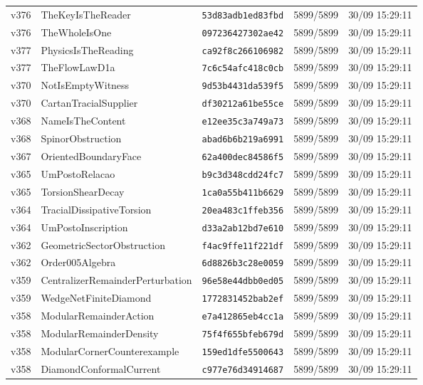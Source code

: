 \documentclass[11pt]{article}
\theoremstyle{definition}\newtheorem{deriv}{Derivação}
\begin{document}
{\begin{longtable}{@{}lllll@{}}
v376 & TheKeyIsTheReader & \texttt{53d83adb1ed83fbd} & 5899/5899 & 30/09 15:29:11 \\
v376 & TheWholeIsOne & \texttt{097236427302ae42} & 5899/5899 & 30/09 15:29:11 \\
v377 & PhysicsIsTheReading & \texttt{ca92f8c266106982} & 5899/5899 & 30/09 15:29:11 \\
v377 & TheFlowLawD1a & \texttt{7c6c54afc418c0cb} & 5899/5899 & 30/09 15:29:11 \\
v370 & NotIsEmptyWitness & \texttt{9d53b4431da539f5} & 5899/5899 & 30/09 15:29:11 \\
v370 & CartanTracialSupplier & \texttt{df30212a61be55ce} & 5899/5899 & 30/09 15:29:11 \\
v368 & NameIsTheContent & \texttt{e12ee35c3a749a73} & 5899/5899 & 30/09 15:29:11 \\
v368 & SpinorObstruction & \texttt{abad6b6b219a6991} & 5899/5899 & 30/09 15:29:11 \\
v367 & OrientedBoundaryFace & \texttt{62a400dec84586f5} & 5899/5899 & 30/09 15:29:11 \\
v365 & UmPostoRelacao & \texttt{b9c3d348cdd24fc7} & 5899/5899 & 30/09 15:29:11 \\
v365 & TorsionShearDecay & \texttt{1ca0a55b411b6629} & 5899/5899 & 30/09 15:29:11 \\
v364 & TracialDissipativeTorsion & \texttt{20ea483c1ffeb356} & 5899/5899 & 30/09 15:29:11 \\
v364 & UmPostoInscription & \texttt{d33a2ab12bd7e610} & 5899/5899 & 30/09 15:29:11 \\
v362 & GeometricSectorObstruction & \texttt{f4ac9ffe11f221df} & 5899/5899 & 30/09 15:29:11 \\
v362 & Order005Algebra & \texttt{6d8826b3c28e0059} & 5899/5899 & 30/09 15:29:11 \\
v359 & CentralizerRemainderPerturbation & \texttt{96e58e44dbb0ed05} & 5899/5899 & 30/09 15:29:11 \\
v359 & WedgeNetFiniteDiamond & \texttt{1772831452bab2ef} & 5899/5899 & 30/09 15:29:11 \\
v358 & ModularRemainderAction & \texttt{e7a412865eb4cc1a} & 5899/5899 & 30/09 15:29:11 \\
v358 & ModularRemainderDensity & \texttt{75f4f655bfeb679d} & 5899/5899 & 30/09 15:29:11 \\
v358 & ModularCornerCounterexample & \texttt{159ed1dfe5500643} & 5899/5899 & 30/09 15:29:11 \\
v358 & DiamondConformalCurrent & \texttt{c977e76d34914687} & 5899/5899 & 30/09 15:29:11 \\

\end{longtable}}
\end{document}
